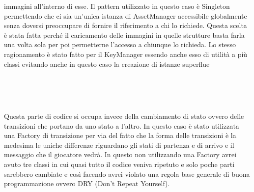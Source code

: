 \documentclass[a4paper,12pt]{report}
\begin{document}
    immagini all’interno di esse. Il pattern utilizzato in questo caso è Singleton permettendo che ci sia un'unica istanza
    di AssetManager accessibile globalmente senza doversi preoccupare di fornire il riferimento a chi lo richiede.
    Questa scelta è stata fatta perché il caricamento delle immagini in quelle strutture basta farla una volta sola per poi
    permetterne l’accesso a chiunque lo richieda. Lo stesso ragionamento è stato fatto per il KeyManager essendo anche esso
    di utilità a più classi evitando anche in questo caso la creazione di istanze superflue
    \\
    \\
    \par
    \\
    \\
    \par Questa parte di codice si occupa invece della cambiamento di stato ovvero delle transizioni che portano da uno stato
    a l’altro. In questo caso è stato utilizzata una Factory di transizione per via del fatto che la forma delle transizioni
    è la medesima  le uniche differenze riguardano gli stati di partenza e di arrivo e il messaggio che il giocatore vedrà.
    In questo non utilizzando una Factory avrei avuto tre classi in cui quasi tutto il codice veniva ripetuto e solo poche
    parti sarebbero cambiate  e così facendo avrei violato una regola base generale di buona programmazione ovvero
    DRY (Don’t Repeat Yourself).
    \\
    \\
    \par
\end{document}
